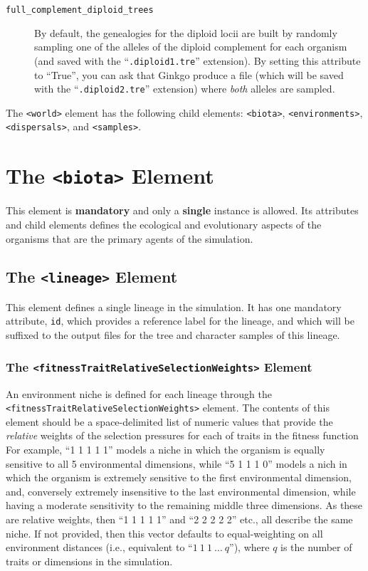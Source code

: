 \documentclass[11pt]{article}
\newcommand{\xmlelem}[1]{{\tt<\textcolor{xmlelem}{#1}>}}
\newcommand{\xmlattr}[1]{{\tt\textcolor{xmlattr}{#1}}}
\begin{document}
\begin{description}
	\item[\xmlattr{full\_complement\_diploid\_trees}]	By default, the genealogies for the diploid locii are built by randomly sampling one of the alleles of the diploid complement for each organism (and saved with the ``{\tt .diploid1.tre}'' extension). By setting this attribute to ``True'', you can ask that Ginkgo produce a file (which will be saved with the ``{\tt .diploid2.tre}''  extension) where \textit{both} alleles are sampled.
\end{description}

The \xmlelem{world} element has the following child elements: \xmlelem{biota}, \xmlelem{environments}, \xmlelem{dispersals}, and \xmlelem{samples}.


\section{The \xmlelem{biota} Element}

This element is \textbf{mandatory} and only a \textbf{single} instance is allowed.
Its attributes and child elements defines the ecological and evolutionary aspects of the organisms that are the primary agents of the simulation.

\subsection{The \xmlelem{lineage} Element}
This element defines a single lineage in the simulation. It has one mandatory attribute, \xmlattr{id}, which provides a reference label for the lineage, and which will be suffixed to the output files for the tree and character samples of this lineage.


\subsubsection{The \xmlelem{fitnessTraitRelativeSelectionWeights} Element}

An environment niche is defined for each lineage through the \xmlelem{fitnessTraitRelativeSelectionWeights} element.
The contents of this element should be a space-delimited list of numeric values that provide the \textit{relative} weights of the selection pressures for each of traits in the fitness function
For example, ``1 1 1 1 1'' models a niche in which the organism is equally sensitive to all 5 environmental dimensions, while ``5 1 1 1 0'' models a nich in which the organism is extremely sensitive to the first environmental dimension, and, conversely extremely insensitive to the last environmental dimension, while having a moderate sensitivity to the remaining middle three dimensions.
As these are relative weights, then ``1 1 1 1 1'' and ``2 2 2 2 2'' etc., all describe the same niche.
If not provided, then this vector defaults to equal-weighting on all environment distances (i.e., equivalent to ``$1 \ 1 \ 1 \ \dots \ q$''), where $q$ is the number of traits or dimensions in the simulation.
\end{document}
